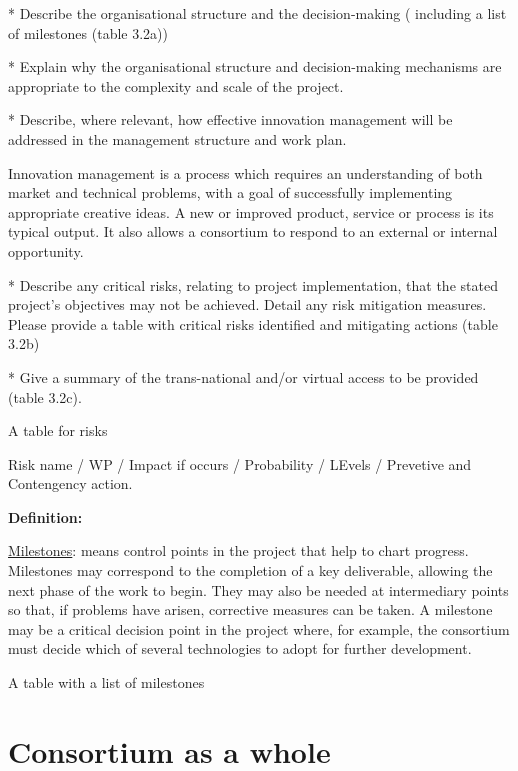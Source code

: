 \begin{todo}{}\color{red}
  * Describe the organisational structure and the decision-making ( including a list of milestones (table 3.2a))

  * Explain why the organisational structure and decision-making mechanisms are appropriate to the complexity and scale of the project.

  * Describe, where relevant, how effective innovation management will be addressed in the management structure and work plan.

  Innovation management is a process which requires an understanding of both market and technical problems, with a goal of successfully implementing appropriate creative ideas. A new or improved product, service or process is its typical output. It also allows a consortium to respond to an external or internal opportunity.

  * Describe any critical risks, relating to project implementation, that the stated project's objectives may not be achieved. Detail any risk mitigation measures. Please provide a table with critical risks identified and mitigating actions (table 3.2b)

  * Give a summary of the trans-national and/or virtual access to be provided (table 3.2c).


  {\color{red} A table for risks}

    Risk name / WP / Impact if occurs / Probability / LEvels / Prevetive and
    Contengency action.

  {\bf Definition:}
  
  \underline{Milestones}: means control points in the project that help to chart progress. Milestones may correspond to the completion of a key deliverable, allowing the next phase of the work to begin. They may also be needed at intermediary points so that, if problems have arisen, corrective measures can be taken. A milestone may be a critical decision point in the project where, for example, the consortium must decide which of several technologies to adopt for further development.
\end{todo}


{\color{red} A table with a list of milestones}



\section{Consortium as a whole}\label{sec:consortium}


